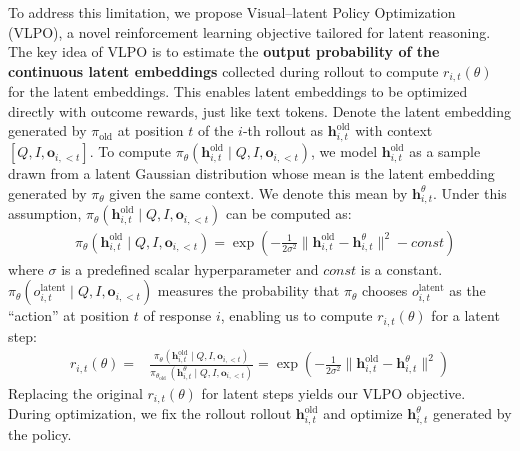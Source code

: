 To address this limitation, we propose Visual–latent Policy Optimization (VLPO), a novel reinforcement learning objective tailored for latent reasoning. The key idea of VLPO is to estimate the \textbf{output probability of the continuous latent embeddings} collected during rollout to compute $r_{i,t}(\theta)$ for the latent embeddings. This enables latent embeddings to be optimized directly with outcome rewards, just like text tokens. Denote the latent embedding generated by $\pi_{\text{old}}$ at position $t$ of the $i$-th rollout as $\mathbf{h}^{\text{old}}_{i,t}$ with context $[Q,I,\mathbf{o}_{i,<t}]$. To compute $\pi_{\theta}(\mathbf{h}^{\text{old}}_{i,t}\mid Q,I,\mathbf{o}_{i,<t})$, we model $\mathbf{h}^{\text{old}}_{i,t}$ as a sample drawn from a latent Gaussian distribution whose mean is the latent embedding generated by $\pi_{\theta}$ given the same context. We denote this mean by $\mathbf{h}^{\theta}_{i,t}$. Under this assumption, $\pi_{\theta}(\mathbf{h}^{\text{old}}_{i,t} \mid Q,I,\mathbf{o}_{i,<t})$ can be computed as:
\begin{equation}
    \begin{aligned}
        &\pi_{\theta}(\mathbf{h}^{\text{old}}_{i,t}\mid Q,I,\mathbf{o}_{i,<t}) = \exp\left( -\frac{1}{2\sigma^2}\|\mathbf{h}^{\text{old}}_{i,t}-\mathbf{h}^{\theta}_{i,t}\|^2 - const \right)
    \end{aligned}
\end{equation}
where $\sigma$ is a predefined scalar hyperparameter and $const$ is a constant. $\pi_{\theta}(o^{\text{latent}}_{i,t} \mid Q,I,\mathbf{o}_{i,<t})$ measures the probability that $\pi_{\theta}$ chooses $o^{\text{latent}}_{i,t}$ as the ``action'' at position $t$ of response $i$, enabling us to compute $r_{i,t}(\theta)$ for a latent step:
\begin{equation}
\label{eq:vlpo}
\begin{aligned}
    r_{i,t}(\theta) = &  \frac{\pi_\theta\left(\mathbf{h}^{\text{old}}_{i,t} \mid Q, I, \mathbf{o}_{i,<t}\right)}{\pi_{\theta_{\text {old }}}\left(\mathbf{h}^{\theta}_{i,t} \mid Q, I, \mathbf{o}_{i,<t}\right)}=\exp \left(-\frac{1}{2\sigma^2}\|\mathbf{h}^{\text{old}}_{i,t}-\mathbf{h}^{\theta}_{i,t}\|^2 \right)
\end{aligned}
\end{equation}
Replacing the original $r_{i,t}(\theta)$ for latent steps yields our VLPO objective. During optimization, we fix the rollout rollout $\mathbf{h}^{\text{old}}_{i,t}$ and optimize $\mathbf{h}^{\theta}_{i,t}$ generated by the policy.

